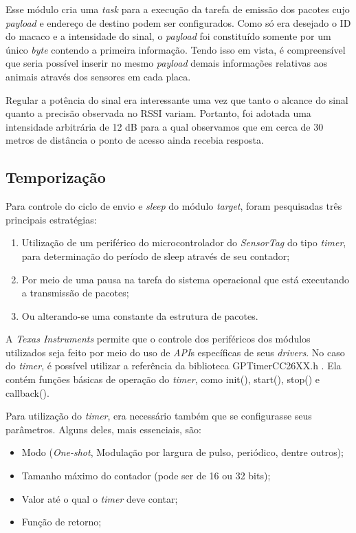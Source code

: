 Esse módulo cria uma \emph{task} para a execução da tarefa de emissão dos pacotes cujo \emph{payload} e endereço de destino podem ser configurados. Como só era desejado o ID do macaco e a intensidade do sinal, o \emph{payload} foi constituído somente por um único \emph{byte} contendo a primeira informação. Tendo isso em vista, é compreensível que seria possível inserir no mesmo \emph{payload} demais informações relativas aos animais através dos sensores em cada placa.

Regular a potência do sinal era interessante uma vez que tanto o alcance do sinal quanto a precisão observada no RSSI variam. Portanto, foi adotada uma intensidade arbitrária de 12 dB para a qual observamos que em cerca de 30 metros de distância o ponto de acesso ainda recebia resposta.

\subsection{Temporização}

Para controle do ciclo de envio e \emph{sleep} do módulo \emph{target}, foram pesquisadas três principais estratégias:

\begin{enumerate}
  \item Utilização de um periférico do microcontrolador do \emph{SensorTag} do tipo \emph{timer}, para determinação do período de sleep através de seu contador;
  \item Por meio de uma pausa na tarefa do sistema operacional que está executando a transmissão de pacotes;
  \item Ou alterando-se uma constante da estrutura de pacotes.
\end{enumerate}

A \emph{Texas Instruments} permite que o controle dos periféricos dos módulos utilizados seja feito por meio do uso de \emph{API}s específicas de seus \emph{drivers}. No caso do \emph{timer}, é possível utilizar a referência da biblioteca GPTimerCC26XX.h \cite{gptimer}. Ela contém funções básicas de operação do \emph{timer}, como init(), start(), stop() e callback().

Para utilização do \emph{timer}, era necessário também que se configurasse seus parâmetros. Alguns deles, mais essenciais, são:

\begin{itemize}
	\item Modo (\emph{One-shot}, Modulação por largura de pulso, periódico, dentre outros);
	\item Tamanho máximo do contador (pode ser de 16 ou 32 bits);
	\item Valor até o qual o \emph{timer} deve contar;
	\item Função de retorno;
\end{itemize}

